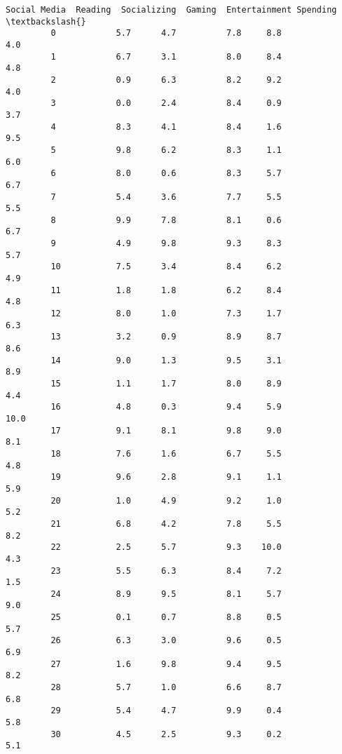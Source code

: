 \documentclass[11pt]{article}
\begin{document}
\begin{Verbatim}[commandchars=\\\{\}]
             Social Media  Reading  Socializing  Gaming  Entertainment Spending  \textbackslash{}
         0            5.7      4.7          7.8     8.8                     4.0   
         1            6.7      3.1          8.0     8.4                     4.8   
         2            0.9      6.3          8.2     9.2                     4.0   
         3            0.0      2.4          8.4     0.9                     3.7   
         4            8.3      4.1          8.4     1.6                     9.5   
         5            9.8      6.2          8.3     1.1                     6.0   
         6            8.0      0.6          8.3     5.7                     6.7   
         7            5.4      3.6          7.7     5.5                     5.5   
         8            9.9      7.8          8.1     0.6                     6.7   
         9            4.9      9.8          9.3     8.3                     5.7   
         10           7.5      3.4          8.4     6.2                     4.9   
         11           1.8      1.8          6.2     8.4                     4.8   
         12           8.0      1.0          7.3     1.7                     6.3   
         13           3.2      0.9          8.9     8.7                     8.6   
         14           9.0      1.3          9.5     3.1                     8.9   
         15           1.1      1.7          8.0     8.9                     4.4   
         16           4.8      0.3          9.4     5.9                    10.0   
         17           9.1      8.1          9.8     9.0                     8.1   
         18           7.6      1.6          6.7     5.5                     4.8   
         19           9.6      2.8          9.1     1.1                     5.9   
         20           1.0      4.9          9.2     1.0                     5.2   
         21           6.8      4.2          7.8     5.5                     8.2   
         22           2.5      5.7          9.3    10.0                     4.3   
         23           5.5      6.3          8.4     7.2                     1.5   
         24           8.9      9.5          8.1     5.7                     9.0   
         25           0.1      0.7          8.8     0.5                     5.7   
         26           6.3      3.0          9.6     0.5                     6.9   
         27           1.6      9.8          9.4     9.5                     8.2   
         28           5.7      1.0          6.6     8.7                     6.8   
         29           5.4      4.7          9.9     0.4                     5.8   
         30           4.5      2.5          9.3     0.2                     5.1   

\end{Verbatim}
\end{document}
